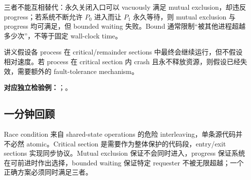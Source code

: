 三者不能互相替代：永久关闭入口可以 vacuously 满足 mutual exclusion，却违反 progress；若系统不断允许 $P_0$ 进入而让 $P_1$ 永久等待，则 mutual exclusion 与 progress 均可满足，但 bounded waiting 失败。Bound 通常限制“被其他进程超越多少次”，不等于固定 wall-clock time。

讲义假设各 process 在 critical/remainder sections 中最终会继续运行，但不假设相对速度。若 process 在 critical section 内 crash 且永不释放资源，则假设已经失效，需要额外的 fault-tolerance mechanism。

\textbf{对应独立检验例：}；。

\subsection{一分钟回顾}

Race condition 来自 shared-state operations 的危险 interleaving，单条源代码并不必然 atomic。Critical section 是需要作为整体保护的代码段，entry/exit sections 实现同步协议。Mutual exclusion 保证不会同时进入，progress 保证系统在可前进时作出选择，bounded waiting 保证特定 requester 不被无限超越；一个正确方案必须同时满足三者。

